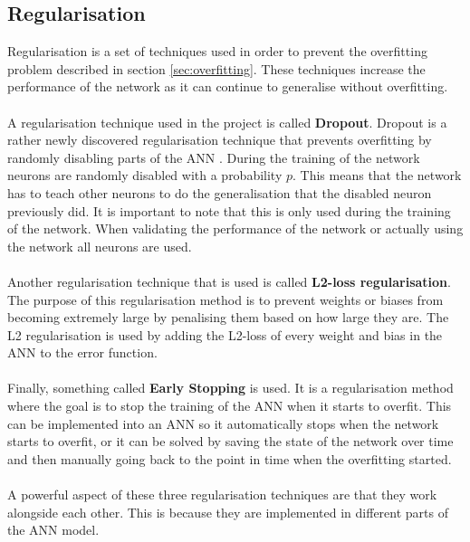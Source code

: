 \subsection{Regularisation}
Regularisation is a set of techniques used in order to prevent the overfitting problem described in section \ref{sec:overfitting}. These techniques increase the performance of the network as it can continue to generalise without overfitting. 
\\\\
A regularisation technique used in the project is called \textbf{Dropout}. Dropout is a rather newly discovered regularisation technique that prevents overfitting by randomly disabling parts of the ANN \parencite{srivastava2014dropout}. During the training of the network neurons are randomly disabled with a probability $p$. This means that the network has to teach other neurons to do the generalisation that the disabled neuron previously did. It is important to note that this is only used during the training of the network. When validating the performance of the network or actually using the network all neurons are used.
\\\\
Another regularisation technique that is used is called \textbf{L2-loss regularisation}. The purpose of this regularisation method is to prevent weights or biases from becoming extremely large by penalising them based on how large they are. The L2 regularisation is used by adding the L2-loss of every weight and bias in the ANN to the error function.
\\\\
Finally, something called \textbf{Early Stopping} is used. It is a regularisation method where the goal is to stop the training of the ANN when it starts to overfit. This can be implemented into an ANN so it automatically stops when the network starts to overfit, or it can be solved by saving the state of the network over time and then manually going back to the point in time when the overfitting started.
\\\\
A powerful aspect of these three regularisation techniques are that they work alongside each other. This is because they are implemented in different parts of the ANN model.

